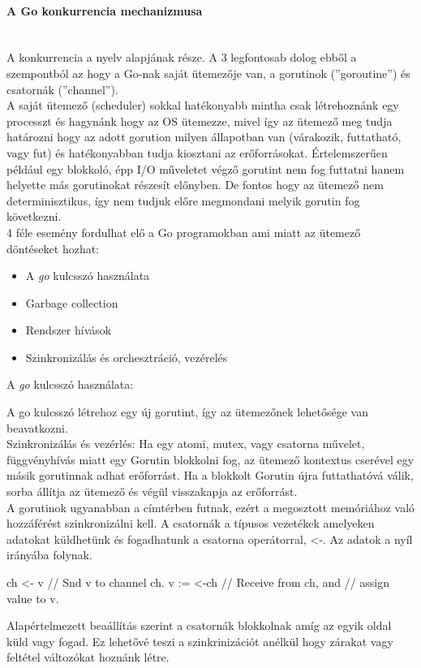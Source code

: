 
\paragraph{A Go konkurrencia mechanizmusa} \mbox{} \\
A konkurrencia a nyelv alapjának része. A 3 legfontosab dolog ebből a szempontból az hogy a Go-nak saját ütemezője van,
a gorutinok (''goroutine'') és csatornák (''channel'').\\
A saját ütemező (scheduler) sokkal hatékonyabb mintha csak létrehoznánk egy processzt és hagynánk hogy az OS ütemezze,
mivel így az ütemező meg tudja határozni hogy az adott gorution milyen állapotban van (várakozik, futtatható, vagy fut) és hatékonyabban tudja
kiosztani az erőforrásokat. Értelemszerűen például egy blokkoló, épp I/O műveletet végző gorutint nem fog futtatni hanem helyette más gorutinokat részesít
előnyben. De fontos hogy az ütemező nem determinisztikus, így nem tudjuk előre megmondani melyik gorutin fog következni.\\
4 féle esemény fordulhat elő a Go programokban ami miatt az ütemező döntéseket hozhat:
\begin{itemize}
    \item A \emph{go} kulcsszó használata
    \item Garbage collection
    \item Rendszer hívások
    \item Szinkronizálás és orchesztráció, vezérelés
\end{itemize}
A \emph{go} kulcsszó használata: \par
A go kulcsszó létrehoz egy új gorutint, így az ütemezőnek lehetősége van beavatkozni.\\
Szinkronizálás és vezérlés:
Ha egy atomi, mutex, vagy csatorna művelet, függvényhívás miatt egy Gorutin blokkolni fog, az ütemező kontextus cserével egy másik gorutinnak adhat erőforrást. Ha a blokkolt Gorutin újra futtathatóvá válik, sorba állítja az ütemező és végül visszakapja az erőforrást.\\

A gorutinok ugyanabban a címtérben futnak, ezért a megosztott memóriához való hozzáférést szinkronizálni kell.
A csatornák a típusos vezetékek amelyeken adatokat küldhetünk és fogadhatunk a csatorna operátorral, <-.
Az adatok a nyíl irányába folynak.
\begin{python}
    ch <- v    // Snd v to channel ch.
    v := <-ch  // Receive from ch, and
    // assign value to v.
\end{python}
Alapértelmezett beaállítás szerint a csatornák blokkolnak amíg az egyik oldal küld vagy fogad.
Ez lehetővé teszi a szinkrinizációt anélkül hogy zárakat vagy feltétel változókat hoznánk létre.

